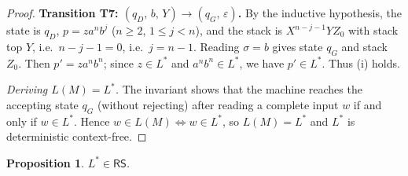 \documentclass[11pt,a4paper]{article}
\newtheorem{proposition}[theorem]{Proposition}
\begin{document}
\begin{proof}
\smallskip
\noindent\textbf{Transition T7: $(q_D,\,b,\,Y)\to(q_G,\,\varepsilon)$.}
By the inductive hypothesis, the state is $q_D$, $p=za^nb^j$
($n\ge 2$, $1\le j<n$), and the stack is $X^{n-j-1}YZ_0$ with stack
top $Y$, i.e.\ $n-j-1=0$, i.e.\ $j=n-1$.
Reading $\sigma=b$ gives state $q_G$ and stack $Z_0$.
Then $p'=za^nb^n$; since $z\in L^*$ and $a^nb^n\in L^*$, we have
$p'\in L^*$.
Thus \textup{(i)} holds.

\medskip
\noindent\emph{Deriving $L(M)=L^*$.}
The invariant shows that the machine reaches the accepting state $q_G$
(without rejecting) after reading a complete input $w$ if and only if
$w\in L^*$.
Hence $w\in L(M)\iff w\in L^*$, so $L(M)=L^*$ and $L^*$ is
deterministic context-free.
\end{proof}

\begin{proposition}\label{prop:lstar-rs}
$L^*\in\mathsf{RS}$.
\end{proposition}
\end{document}
